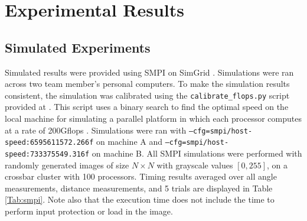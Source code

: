 \documentclass{article}
\begin{document}
\section{Experimental Results}
\subsection{Simulated Experiments}
    Simulated results were provided using SMPI on SimGrid \cite{henri}. Simulations were ran across two team member's personal computers. To make the simulation results consistent,  the simulation was calibrated using the \texttt{calibrate\_flops.py} script provided at \cite{calib}. This script uses a binary search to find the optimal speed on the local machine for simulating a parallel platform in which each processor computes at a rate of 200Gflops \cite{calib}. Simulations were ran with \texttt{--cfg=smpi/host-speed:6595611572.266f} on machine A and \texttt{--cfg=smpi/host-speed:733375549.316f} on machine B. All SMPI simulations were performed with randomly generated images of size $N \times N$ with grayscale values $[0, 255]$, on a crossbar cluster with 100 processors. Timing results averaged over all angle measurements, distance measurements, and 5 trials are displayed in Table \ref{Tab:smpi}. Note also that the execution time does not include the time to perform input protection or load in the image. \\ \\ 
\end{document}
